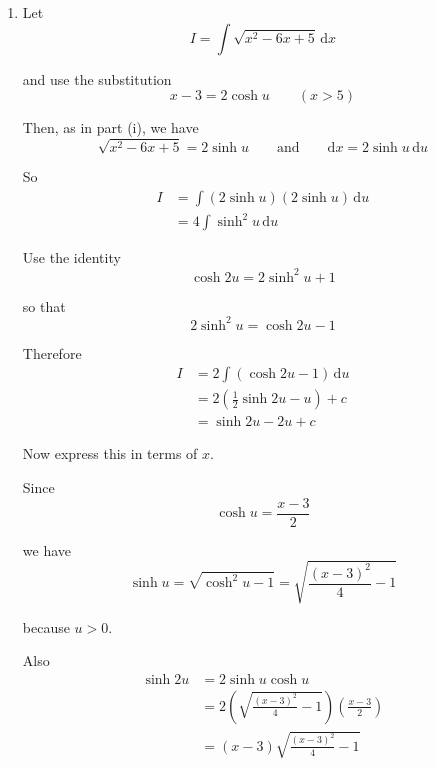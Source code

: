 \documentclass[leqno]{article}
\begin{document}
\begin{enumerate}[
  label=\textbf{\arabic*.},
  leftmargin=*,
  topsep=0pt,
  partopsep=0pt,
  parsep=0pt
]
\begin{djsSolution}
\begin{enumerate}[label=\textbf{(\roman*)}, start=1]
  so
  \[
  u=\operatorname{arcosh}\left(\frac{x-3}{2}\right)
  \]

  Hence
  \[
  \int \frac{1}{\sqrt{x^2-6x+5}}\,\mathrm{d}x
  =\operatorname{arcosh}\left(\frac{x-3}{2}\right)+c
  \]

  Using the standard result
  \[
  \operatorname{arcosh} t=\ln\left(t+\sqrt{t^2-1}\right)\qquad (t\ge 1)
  \]

  we get
  \[
  \int \frac{1}{\sqrt{x^2-6x+5}}\,\mathrm{d}x
  =\ln\left(\frac{x-3}{2}+\sqrt{\frac{(x-3)^2}{4}-1}\right)+c
  \]

  So the answer is
  \[
  \operatorname{arcosh}\left(\frac{x-3}{2}\right)+c
  \]

  and hence
  \[
  \ln\left(\frac{x-3}{2}+\sqrt{\frac{(x-3)^2}{4}-1}\right)+c
  \]

  \item Let
  \[
  I=\int \sqrt{x^2-6x+5}\,\mathrm{d}x
  \]

  and use the substitution
  \[
  x-3=2\cosh u \qquad (x>5)
  \]

  Then, as in part (i), we have
  \[
  \sqrt{x^2-6x+5}=2\sinh u
  \qquad\text{and}\qquad
  \mathrm{d}x=2\sinh u\,\mathrm{d}u
  \]

  So
  \begin{align*}
  I
  &=\int (2\sinh u)(2\sinh u)\,\mathrm{d}u \\
  &=4\int \sinh^2u\,\mathrm{d}u
  \end{align*}

  Use the identity
  \[
  \cosh 2u=2\sinh^2u+1
  \]

  so that
  \[
  2\sinh^2u=\cosh 2u-1
  \]

  Therefore
  \begin{align*}
  I
  &=2\int (\cosh 2u-1)\,\mathrm{d}u \\
  &=2\left(\frac{1}{2}\sinh 2u-u\right)+c \\
  &=\sinh 2u-2u+c
  \end{align*}

  Now express this in terms of $x$.

  Since
  \[
  \cosh u=\frac{x-3}{2}
  \]

  we have
  \[
  \sinh u=\sqrt{\cosh^2u-1}
  =\sqrt{\frac{(x-3)^2}{4}-1}
  \]

  because $u>0$.

  Also
  \begin{align*}
  \sinh 2u
  &=2\sinh u\cosh u \\
  &=2\left(\sqrt{\frac{(x-3)^2}{4}-1}\right)\left(\frac{x-3}{2}\right) \\
  &=(x-3)\sqrt{\frac{(x-3)^2}{4}-1}
  \end{align*}


\end{enumerate}
\end{djsSolution}
\end{enumerate}
\end{document}
